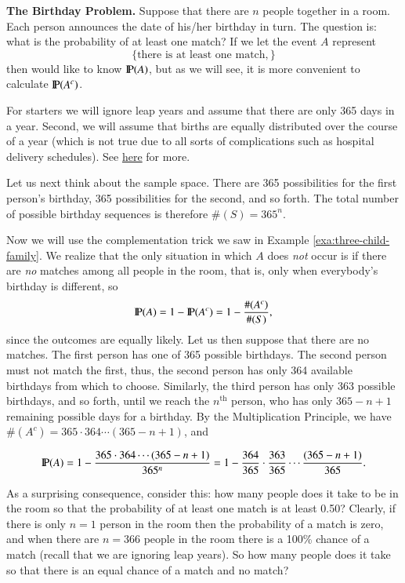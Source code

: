 \documentclass[captions=tableheading]{scrbook}
\begin{document}
\begin{example}
\textbf{The Birthday Problem.} Suppose that there are \(n\) people together in a room. Each person announces the date of his/her birthday in turn. The question is: what is the probability of at least one match? If we let the event \(A\) represent 
\[
\{ \mbox{there is at least one match}, \}
\]
then would like to know \(\P(A)\), but as we will see, it is more convenient to calculate \(\P(A^{c})\).

For starters we will ignore leap years and assume that there are only 365 days in a year. Second, we will assume that births are equally distributed over the course of a year (which is not true due to all sorts of complications such as hospital delivery schedules). See \href{http://en.wikipedia.org/wiki/Birthday_problem}{here} for more.

Let us next think about the sample space. There are 365 possibilities for the first person's birthday, 365 possibilities for the second, and so forth. The total number of possible birthday sequences is therefore \(\#(S)=365^{n}\).

Now we will use the complementation trick we saw in Example \ref{exa:three-child-family}. We realize that the only situation in which \(A\) does \emph{not} occur is if there are \emph{no} matches among all people in the room, that is, only when everybody's birthday is different, so
\[
\P(A)=1-\P(A^{c})=1-\frac{\#(A^{c})}{\#(S)},
\]
since the outcomes are equally likely. Let us then suppose that there are no matches. The first person has one of 365 possible birthdays. The second person must not match the first, thus, the second person has only 364 available birthdays from which to choose. Similarly, the third person has only 363 possible birthdays, and so forth, until we reach the \(n^{\mathrm{th}}\) person, who has only \(365-n+1\) remaining possible days for a birthday. By the Multiplication Principle, we have \(\#(A^{c})=365\cdot364\cdots(365-n+1)\), and

\begin{equation}
\P(A)=1-\frac{365\cdot364\cdots(365-n+1)}{365^{n}}=1-\frac{364}{365}\cdot\frac{363}{365}\cdots\frac{(365-n+1)}{365}.
\end{equation}

As a surprising consequence, consider this: how many people does it take to be in the room so that the probability of at least one match is at least 0.50? Clearly, if there is only \(n=1\) person in the room then the probability of a match is zero, and when there are \(n=366\) people in the room there is a 100\% chance of a match (recall that we are ignoring leap years). So how many people does it take so that there is an equal chance of a match and no match?


\end{example}
\end{document}
